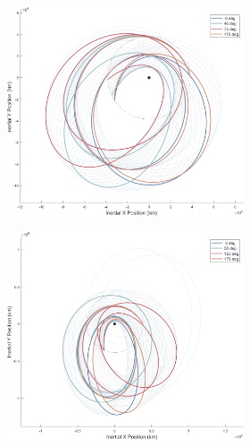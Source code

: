 \documentclass[letterpaper, paper,11pt]{AAS}	%
\begin{document}
\begin{figure}[h!]
    \begin{subfigure}{}
        \includegraphics[trim=75 50 0 0, clip, width=2.75in]{./figs/mooni_ThetaPlot_io_famE_vInf0.3.png}
    \end{subfigure}
    \begin{subfigure}{}
        \includegraphics[trim=75 50 0 0, clip, width=2.75in]{./figs/mooni_ThetaPlot_io_famE_vInf0.6.png}
    \end{subfigure}
\end{figure}
\end{document}
